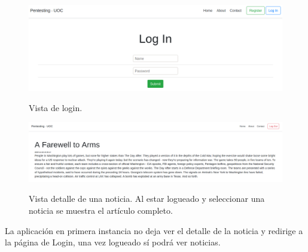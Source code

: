 \documentclass[a4paper,oneside]{article}
\begin{document}
\begin{enumerate}[label=\textbf{\alph*)}]
\begin{figure}[h!]
  \centering
  \includegraphics[scale=0.4]{images/login.png}\\
  \caption{Vista de login.}
  \label{fig:login}
\end{figure}

\begin{figure}[h!]
  \centering
  \includegraphics[scale=0.2]{images/news.png}\\
  \caption{Vista detalle de una noticia. Al estar logueado y seleccionar una noticia se muestra el artículo completo.}
  \label{fig:news}
\end{figure}

\pagebreak

La aplicación en primera instancia no deja ver el detalle de la noticia y redirige a la página de Login, una vez logueado sí podrá ver noticias.\\


\end{enumerate}
\end{document}
